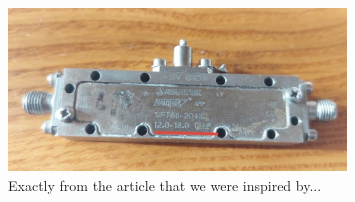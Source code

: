 \begin{figure}[h]
    \centering
    \includegraphics[width=0.8\textwidth]{images/newhope.jpg}
    \caption{Exactly from the article that we were inspired by...}
\end{figure}
